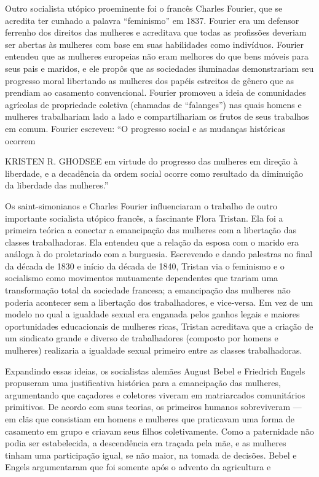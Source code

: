  \par 
Outro socialista utópico proeminente foi o francês Charles Fourier, que se acredita ter cunhado a palavra “feminismo” em 1837. Fourier era um defensor ferrenho dos direitos das mulheres e acreditava que todas as profissões deveriam ser abertas às mulheres com base em suas habilidades como indivíduos. Fourier entendeu que as mulheres europeias não eram melhores do que bens móveis para seus pais e maridos, e ele propôs que as sociedades iluminadas demonstrariam seu progresso moral libertando as mulheres dos papéis estreitos de gênero que as prendiam ao casamento convencional. Fourier promoveu a ideia de comunidades agrícolas de propriedade coletiva (chamadas de “falanges”) nas quais homens e mulheres trabalhariam lado a lado e compartilhariam os frutos de seus trabalhos em comum. Fourier escreveu: “O progresso social e as mudanças históricas ocorrem
 \par 
KRISTEN R. GHODSEE em virtude do progresso das mulheres em direção à liberdade, e a decadência da ordem social ocorre como resultado da diminuição da liberdade das mulheres.”
 \par 
Os saint-simonianos e Charles Fourier influenciaram o trabalho de outro importante socialista utópico francês, a fascinante Flora Tristan. Ela foi a primeira teórica a conectar a emancipação das mulheres com a libertação das classes trabalhadoras. Ela entendeu que a relação da esposa com o marido era análoga à do proletariado com a burguesia. Escrevendo e dando palestras no final da década de 1830 e início da década de 1840, Tristan via o feminismo e o socialismo como movimentos mutuamente dependentes que trariam uma transformação total da sociedade francesa; a emancipação das mulheres não poderia acontecer sem a libertação dos trabalhadores, e vice-versa. Em vez de um modelo no qual a igualdade sexual era enganada pelos ganhos legais e maiores oportunidades educacionais de mulheres ricas, Tristan acreditava que a criação de um sindicato grande e diverso de trabalhadores (composto por homens e mulheres) realizaria a igualdade sexual primeiro entre as classes trabalhadoras.
 \par 
Expandindo essas ideias, os socialistas alemães August Bebel e Friedrich Engels propuseram uma justificativa histórica para a emancipação das mulheres, argumentando que caçadores e coletores viveram em matriarcados comunitários primitivos. De acordo com suas teorias, os primeiros humanos sobreviveram — em clãs que consistiam em homens e mulheres que praticavam uma forma de casamento em grupo e criavam seus filhos coletivamente. Como a paternidade não podia ser estabelecida, a descendência era traçada pela mãe, e as mulheres tinham uma participação igual, se não maior, na tomada de decisões. Bebel e Engels argumentaram que foi somente após o advento da agricultura e
